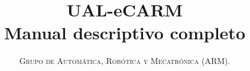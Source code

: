 \documentclass[11pt,a4paper,openright,twoside,final]{book}
\title{\Huge \textbf{UAL-eCARM} \\ \huge Manual descriptivo completo}
\author{\textsc{Grupo de Automática, Robótica y Mecatrónica (ARM).}}
\begin{document}
\frontmatter
\renewcommand{\tablename}{Tabla}
\renewcommand{\listtablename}{Índice de tablas}
\maketitle
\afterpage{\blankpage}

\tableofcontents
\afterpage{\blankpage}
\listoffigures
\afterpage{\blankpage}
\listoftables
\afterpage{\blankpage}
\mainmatter













\end{document}
